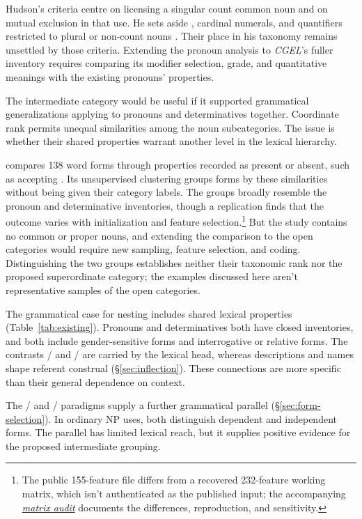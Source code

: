 \documentclass[12pt]{article}
\begin{document}
Hudson's criteria centre on licensing a singular count common noun and on mutual exclusion in that use. He sets aside , cardinal numerals, and quantifiers restricted to plural or non-count nouns \citep[9--10]{hudson2004determiners}. Their place in his taxonomy remains unsettled by those criteria. Extending the pronoun analysis to \textit{CGEL}'s fuller inventory requires comparing its modifier selection, grade, and quantitative meanings with the existing pronouns' properties.

The intermediate category would be useful if it supported grammatical generalizations applying to pronouns and determinatives together. Coordinate rank permits unequal similarities among the noun subcategories. The issue is whether their shared properties warrant another level in the lexical hierarchy.

\textcite{reynolds2021} compares 138 word forms through properties recorded as present or absent, such as accepting . Its unsupervised clustering groups forms by these similarities without being given their category labels. The groups broadly resemble the pronoun and determinative inventories, though a replication finds that the outcome varies with initialization and feature selection.\footnote{The public 155-feature file differs from a recovered 232-feature working matrix, which isn't authenticated as the published input; the accompanying \href{run:matrix-audit.pdf}{\textit{matrix audit}} documents the differences, reproduction, and sensitivity.} But the study contains no common or proper nouns, and extending the comparison to the open categories would require new sampling, feature selection, and coding. Distinguishing the two groups establishes neither their taxonomic rank nor the proposed superordinate category; the examples discussed here aren't representative samples of the open categories.

The grammatical case for nesting includes shared lexical properties (Table~\ref{tab:existing}). Pronouns and determinatives both have closed inventories, and both include gender-sensitive forms and interrogative or relative forms. The contrasts / and / are carried by the lexical head, whereas descriptions and names shape referent construal (§\ref{sec:inflection}). These connections are more specific than their general dependence on context.

The / and / paradigms supply a further grammatical parallel (§\ref{sec:form-selection}). In ordinary NP uses, both distinguish dependent and independent forms. The parallel has limited lexical reach, but it supplies positive evidence for the proposed intermediate grouping.
\end{document}
